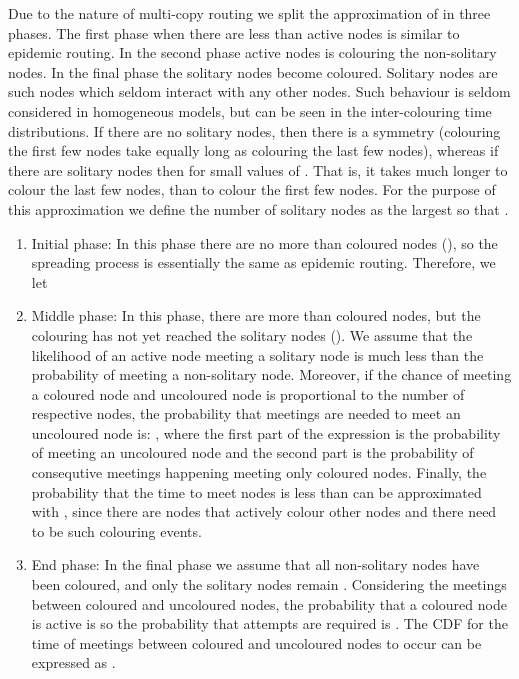\documentclass{article}
\begin{document}
Due to the nature of multi-copy routing we split the approximation of
 in three phases. The first phase when there are
less than  active nodes is similar to epidemic routing. In the
second phase  active nodes is colouring the non-solitary nodes. In
the final phase the solitary nodes become coloured. Solitary nodes are
such nodes which seldom interact with any other nodes. Such behaviour
is seldom considered in homogeneous models, but can be seen in the
inter-colouring time distributions. If there are no solitary nodes,
then there is a symmetry  (colouring the
first few nodes take equally long as colouring the last few nodes),
whereas if there are solitary nodes then 
for small values of . That is, it takes much longer to colour the
last few nodes, than to colour the first few nodes. For the purpose of
this approximation we define the number of solitary nodes  as the
largest  so that .

\begin{enumerate}
\item Initial phase: In this phase there are no more than  coloured
  nodes (), so the spreading process is essentially
  the same as epidemic routing. Therefore, we let 
\item Middle phase: In this phase, there are more than  coloured
  nodes, but the colouring has not yet reached the solitary nodes (). We assume that the likelihood of an active node
  meeting a solitary node is much less than the probability of meeting
  a non-solitary node. Moreover, if the chance of meeting a coloured
  node and uncoloured node is proportional to the number of respective
  nodes, the probability that  meetings are needed to meet an
  uncoloured node is: , where the first part of the
  expression is the probability of meeting an uncoloured node and the
  second part is the probability of  consequtive meetings
  happening meeting only coloured nodes.  Finally, the probability
  that the time to meet  nodes is less than  can be approximated
  with , since there are  nodes
  that actively colour other nodes and there need to be  such
  colouring events.
\item End phase: In the final phase we assume that all non-solitary
  nodes have been coloured, and only the solitary nodes remain . Considering the meetings between coloured and
  uncoloured nodes, the probability that a coloured node is active is
   so the probability that  attempts are required is . The CDF for the time
  of  meetings between coloured and uncoloured nodes to occur can
  be expressed as . 
\end{enumerate}
\end{document}

